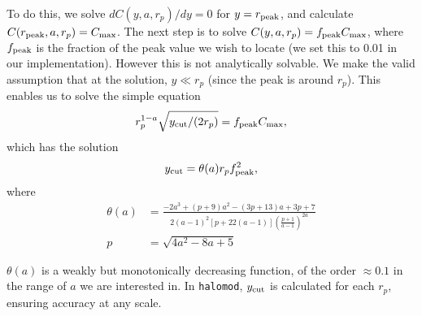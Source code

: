 \documentclass[5p,aas_macros]{elsarticle}
\providecommand{\DIFaddtex}[1]{{\protect\color{blue}\uwave{#1}}} %
\providecommand{\DIFdeltex}[1]{{\protect\color{red}\sout{#1}}}                      %
\providecommand{\DIFaddbegin}{} %
\providecommand{\DIFaddend}{} %
\providecommand{\DIFdelbegin}{} %
\providecommand{\DIFdelend}{} %
\providecommand{\DIFadd}[1]{\texorpdfstring{\DIFaddtex{#1}}{#1}} %
\providecommand{\DIFdel}[1]{\texorpdfstring{\DIFdeltex{#1}}{}} %
\begin{document}
To do this, we solve \DIFdelbegin \DIFdel{$d C(y,a,r_p)/dy = 0$ }\DIFdelend \DIFaddbegin \DIFadd{${\rm d} C(y,a,r_p)/{\rm d}y = 0$ }\DIFaddend for $y=r_{\rm peak}$, and calculate $C(r_{\rm peak},a,r_p) = C_{\rm max}$. The next step is to solve $C(y,a,r_p) = f_{\rm peak}C_{\rm max}$, where $f_{\rm peak}$ is the fraction of the peak value we wish to locate (we set this to 0.01 in our implementation). However this is not analytically solvable. We make the valid assumption that at the solution, $y \ll r_p$ (since the peak is around $r_p$). 
This enables us to solve the simple equation 
\begin{equation}
	\label{eq:projcorrsolve}
	r_p^{1-a}\sqrt{y_{\rm cut}/(2r_p)} = f_{\rm peak}C_{\rm max},
\end{equation}
which has the solution
\begin{equation}
	\label{eq:projcorrsolution}
	y_{\rm cut} = \theta(a)r_pf_{\rm peak}^2,
\end{equation}
where
\begin{align}
	\label{eq:theta}
	\theta(a) &= \frac{-2 a^3+\left(p+9\right) a^2-\left(3p+13\right) a+3p+7}{2(a-1)^2 \left[p+22(a-1)\right]\left(\frac{p+1}{a-1}\right)^{2 a}} \\
	p &= \sqrt{4 a^2-8 a+5}
\end{align}
\DIFdelbegin %

\DIFdelend $\theta(a)$ is a weakly but monotonically decreasing function, of the order $\approx 0.1$ in the range of $a$ we are interested in. In \verb|halomod|, $y_{\rm cut}$ is calculated for each $r_p$, ensuring accuracy at any scale.
\end{document}
